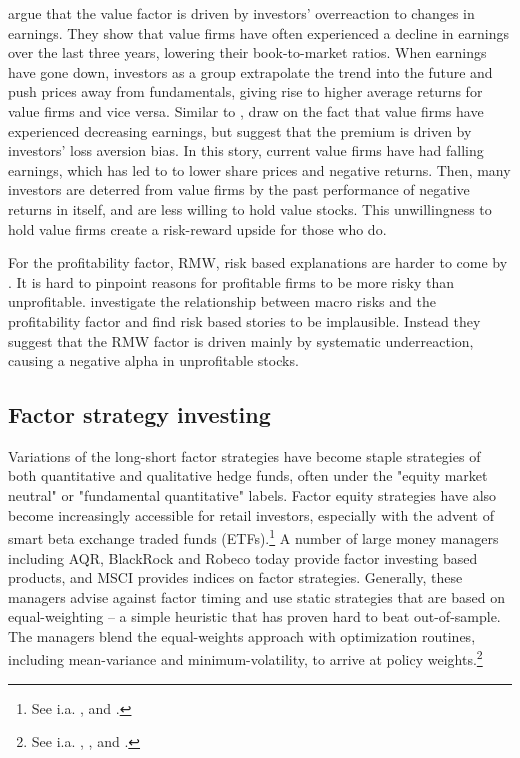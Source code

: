 \textcite{LakonishokShleiferVishny1994} argue that the value factor is driven by investors' overreaction to changes in earnings. They show that value firms have often experienced a decline in earnings over the last three years, lowering their book-to-market ratios. When earnings have gone down, investors as a group extrapolate the trend into the future and push prices away from fundamentals, giving rise to higher average returns for value firms and vice versa. Similar to \textcite{LakonishokShleiferVishny1994}, \textcite{BarberisHuang2001} draw on the fact that value firms have experienced decreasing earnings, but suggest that the premium is driven by investors' loss aversion bias. In this story, current value firms have had falling earnings, which has led to to lower share prices and negative returns. Then, many investors are deterred from value firms by the past performance of negative returns in itself, and are less willing to hold value stocks. This unwillingness to hold value firms create a risk-reward upside for those who do.

For the profitability factor, RMW, risk based explanations are harder to come by \autocite{NovyMarx2013}. It is hard to pinpoint reasons for profitable firms to be more risky than unprofitable. \textcite{Wang2013} investigate the relationship between macro risks and the profitability factor and find risk based stories to be implausible. Instead they suggest that the RMW factor is driven mainly by systematic underreaction, causing a negative alpha in unprofitable stocks.

\subsection{Factor strategy investing}
Variations of the long-short factor strategies have become staple strategies of both quantitative and qualitative hedge funds, often under the "equity market neutral" or "fundamental quantitative" labels. Factor equity strategies have also become increasingly accessible for retail investors, especially with the advent of smart beta exchange traded funds (ETFs).\footnote{See i.a. \textcite{Pedersen2015}, \textcite{AQREMN} and \textcite{McKEMN}.} A number of large money managers including AQR, BlackRock and Robeco today provide factor investing based products, and MSCI provides indices on factor strategies. Generally, these managers advise against factor timing and use static strategies that are based on equal-weighting -- a simple heuristic that has proven hard to beat out-of-sample. The managers blend the equal-weights approach with optimization routines, including mean-variance and minimum-volatility, to arrive at policy weights.\footnote{See i.a. \textcite{AQRSiren}, \textcite{BlackRock}, \textcite{MSCI} and \textcite{Robeco}.}

